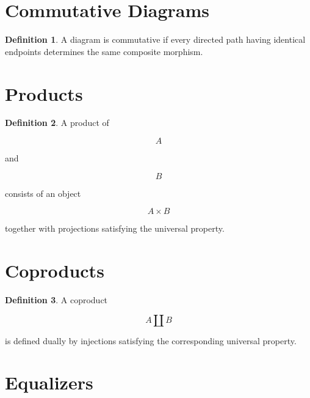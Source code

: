 \documentclass[11pt]{book}
\numberwithin{equation}{chapter}
\theoremstyle{definition}
\newtheorem{definition}{Definition}[chapter]
\theoremstyle{plain}
\begin{document}

\section{Commutative Diagrams}

\begin{definition}

A diagram is commutative if every directed path having identical
endpoints determines the same composite morphism.

\end{definition}


\section{Products}

\begin{definition}

A product of

\[
A
\]

and

\[
B
\]

consists of an object

\[
A\times B
\]

together with projections satisfying the universal property.

\end{definition}


\section{Coproducts}

\begin{definition}

A coproduct

\[
A\amalg B
\]

is defined dually by injections satisfying the corresponding universal
property.

\end{definition}


\section{Equalizers}
\end{document}
